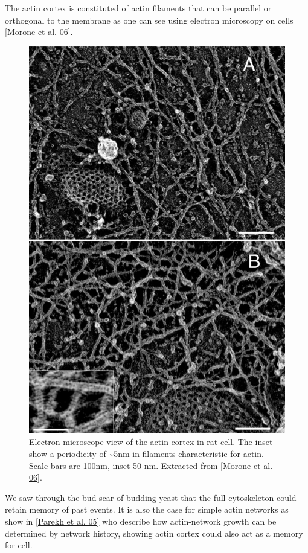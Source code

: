 \documentclass[A4paperpaper,11pt,english]{sphinxmanual}
\begin{document}
The actin cortex is constituted of actin filaments that can be parallel or
orthogonal to the membrane as one can see using electron microscopy on cells
{\hyperref[parts/part1:morone2006b]{{[}Morone et al. 06{]}}}.
\begin{figure}[htbp]
\centering
\capstart

\includegraphics[width=0.700\linewidth]{Actin-Cortex-Moronne-2006.jpg}
\caption{Electron microscope view of the actin cortex in rat cell. The inset
show a periodicity of \textasciitilde{}5nm in filaments characteristic for actin.  Scale
bars are 100nm, inset 50 nm. Extracted from {\hyperref[parts/part1:morone2006b]{{[}Morone et al. 06{]}}}.}\label{parts/part1:fig-electro-cortex}\end{figure}

We saw through the bud scar of budding yeast that the full cytoskeleton could
retain memory of past events. It is also the case for simple actin networks as
show in {\hyperref[parts/part1:parekh2005]{{[}Parekh et al. 05{]}}} who describe how actin-network growth can be
determined by network history, showing actin cortex could also act as a memory
for cell.
\end{document}
